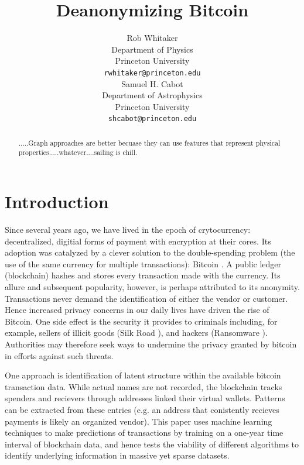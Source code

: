 \documentclass{article} %
\title{Deanonymizing Bitcoin}
\author{
Rob Whitaker\\
Department of Physics\\
Princeton University\\
\texttt{rwhitaker@princeton.edu} \\
\And
Samuel H. Cabot \\
Department of Astrophysics\\
Princeton University \\
\texttt{shcabot@princeton.edu} \\
}
\begin{document}
\setlength{\belowcaptionskip}{-10pt}

\maketitle

\begin{abstract}



.....Graph approaches are better becuase they can use features that represent physical properties.....whatever....sailing is chill.



\end{abstract}

\section{Introduction}

Since several years ago, we have lived in the epoch of crytocurrency: decentralized, digitial forms of payment with encryption at their cores. Its adoption was catalyzed by a clever solution to the double-spending problem (the use of the same currency for multiple transactions): Bitcoin \cite{Nakamoto2008}. A public ledger (blockchain) hashes and stores every transaction made with the currency. Its allure and subsequent popularity, however, is perhaps attributed to its anonymity. Transactions never demand the identification of either the vendor or customer. Hence increased privacy concerns in our daily lives have driven the rise of Bitcoin. One side effect is the security it provides to criminals including, for example, sellers of illicit goods (Silk Road \cite{Christin2013}), and hackers (Ransomware \cite{Pathak2016}). Authorities may therefore seek ways to undermine the privacy granted by bitcoin in efforts against such threats.

One approach is identification of latent structure within the available bitcoin transaction data. While actual names are not recorded, the blockchain tracks spenders and recievers through addresses linked their virtual wallets. Patterns can be extracted from these entries (e.g. an address that conistently recieves payments is likely an organized vendor). This paper uses machine learning techniques to make predictions of transactions by training on a one-year time interval of blockchain data, and hence tests the viability of different algorithms to identify underlying information in massive yet sparse datasets.
\end{document}
